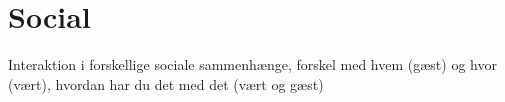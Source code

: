 \section{Social}
\label{TestresultaterSocialAcceptSocial}
%
Interaktion i forskellige sociale sammenhænge, forskel med hvem (gæst) og hvor (vært), hvordan har du det med det (vært og gæst) 
